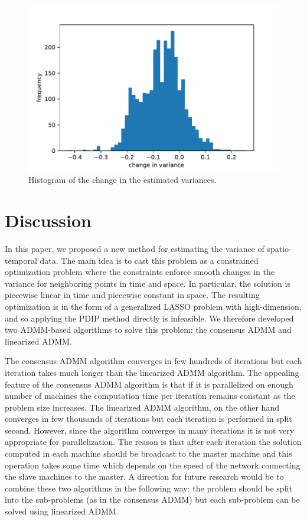 \documentclass{article}
\begin{document}
\begin{figure}[ht]
	\vskip 0.2in
	\begin{center}
		\centerline{\includegraphics[width=1\columnwidth]{Figures/hist_avg_change}}
		\caption{Histogram of the change in the estimated variances.}
		\label{fig:hist_avg_change}
	\end{center}
	\vskip -0.2in
\end{figure}
 

\section{Discussion}
In this paper, we proposed a new method for estimating the variance of spatio-temporal data. The main idea is to cast this problem as a constrained optimization problem where the constraints enforce smooth changes in the variance for neighboring points in time and space. In particular, the solution is piecewise linear in time and piecewise constant in space. The resulting optimization is in the form of a generalized LASSO problem with high-dimension, and so applying the PDIP method directly is infeasible. We therefore developed two ADMM-based algorithms to solve this problem: the consensus ADMM and linearized ADMM.

The consensus ADMM algorithm converges in few hundreds of iterations but each iteration takes much longer than the linearized ADMM algorithm. The appealing feature of the consensus ADMM algorithm is that if it is parallelized on enough number of machines the computation time per iteration remains constant as the problem size increases. The linearized ADMM algorithm, on the other hand converges in few thousands of iterations but each iteration is performed in split second. However, since the algorithm converges in many iterations it is not very appropriate for parallelization. The reason is that after each iteration the solution computed in each machine should be broadcast to the master machine and this operation takes some time which depends on the speed of the network connecting the slave machines to the master. A direction for future research would be to combine these two algorithms in the following way: the problem should be split into the sub-problems (as in the consensus ADMM) but each sub-problem can be solved using linearized ADMM.
\end{document}
